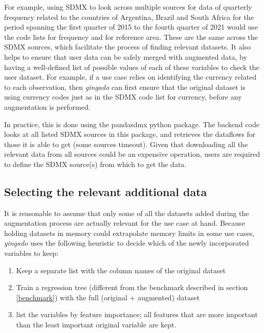 \documentclass{article}
\begin{document}
For example, using SDMX to look across multiple sources for data of quarterly frequency related to the countries of Argentina, Brazil and South Africa for the period spanning the first quarter of 2015 to the fourth quarter of 2021 would use the code lists for frequency and for reference area. These are the same across the SDMX sources, which facilitate the process of finding relevant datasets. It also helps to ensure that user data can be safely merged with augmented data, by having a well-defined list of possible values of each of these variables to check the user dataset. For example, if a use case relies on identifying the currency related to each observation, then \textit{gingado} can first ensure that the original dataset is using currency codes just as in the SDMX code list for currency, before any augmentation is performed.

In practice, this is done using the pandasdmx python package. The backend code looks at all listed SDMX sources in this package, and retrieves the dataflows for those it is able to get (some sources timeout). Given that downloading all the relevant data from all sources could be an expensive operation, users are required to define the SDMX source(s) from which to get the data.

\subsection{Selecting the relevant additional data}
It is reasonable to assume that only some of all the datasets added during the augmentation process are actually relevant for the use case at hand. Because holding datasets in memory could extrapolate memory limits in some use cases, \textit{gingado} uses the following heuristic to decide which of the newly incorporated variables to keep:

\begin{enumerate}
    \item Keep a separate list with the column names of the original dataset
    \item Train a regression tree (different from the benchmark described in section \ref{benchmark}) with the full (original + augmented) dataset
    \item list the variables by feature importance; all features that are more important than the least important original variable are kept.
\end{enumerate}
\end{document}
